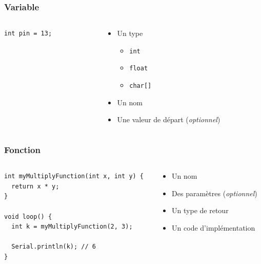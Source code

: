 \documentclass[aspectratio=169,utf8,french]{beamer}
\begin{document}
\begin{frame}[fragile]
  \frametitle{Variable}
  \begin{columns}
    \begin{column}{.4\textwidth}
      \begin{lstlisting}
int pin = 13;
      \end{lstlisting}
    \end{column}
    \begin{column}{.6\textwidth}
      \begin{itemize}
        \item Un type
        \begin{itemize}
          \item \lstinline{int}
          \item \lstinline{float}
          \item \lstinline{char[]}
        \end{itemize}
        \item Un nom
        \item Une valeur de départ (\emph{optionnel})
      \end{itemize}
    \end{column}
  \end{columns}
\end{frame}

\begin{frame}[fragile]
  \frametitle{Fonction}
  \begin{columns}
    \begin{column}{.6\textwidth}
      \begin{lstlisting}
int myMultiplyFunction(int x, int y) {
  return x * y;
}

void loop() {
  int k = myMultiplyFunction(2, 3);

  Serial.println(k); // 6
}
      \end{lstlisting}
    \end{column}
    \begin{column}{.4\textwidth}
      \begin{itemize}
        \item Un nom
        \item Des paramètres (\emph{optionnel})
        \item Un type de retour
        \item Un code d’implémentation
      \end{itemize}
    \end{column}
  \end{columns}
\end{frame}
\end{document}
